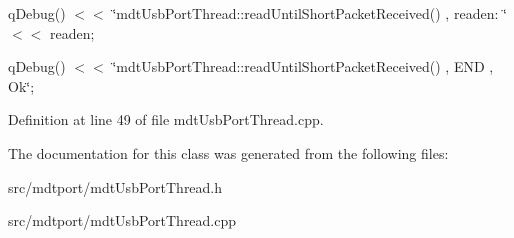 qDebug() $<$$<$ \char`\"{}mdtUsbPortThread::readUntilShortPacketReceived() , readen: \char`\"{} $<$$<$ readen;

qDebug() $<$$<$ \char`\"{}mdtUsbPortThread::readUntilShortPacketReceived() , END , Ok\char`\"{}; 



Definition at line 49 of file mdtUsbPortThread.cpp.



The documentation for this class was generated from the following files:\begin{DoxyCompactItemize}
\item 
src/mdtport/mdtUsbPortThread.h\item 
src/mdtport/mdtUsbPortThread.cpp\end{DoxyCompactItemize}
